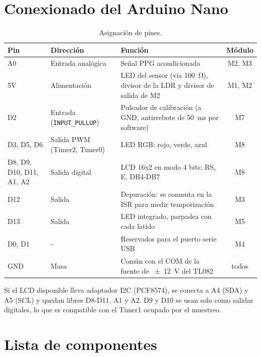 \documentclass[11pt,a4paper]{article}
\begin{document}
\section{Conexionado del Arduino Nano}

\begin{table}[H]
\centering\small
\caption{Asignación de pines.}
\label{tab:pines}
\begin{tabularx}{\textwidth}{llXc}
\toprule
Pin & Dirección & Función & Módulo \\
\midrule
A0      & Entrada analógica & Señal PPG acondicionada & M2, M3 \\
5V      & Alimentación & LED del sensor (vía \qty{100}{\ohm}), divisor de la LDR y divisor de salida de M2 & M1, M2 \\
D2      & Entrada (\texttt{INPUT\_PULLUP}) & Pulsador de calibración (a GND, antirrebote de \qty{50}{ms} por software) & M7 \\
D3, D5, D6 & Salida PWM (Timer2, Timer0) & LED RGB: rojo, verde, azul & M8 \\
D8, D9, D10, D11, A1, A2 & Salida digital & LCD 16x2 en modo 4 bits: RS, E, DB4-DB7 & M8 \\
D12     & Salida & Depuración: se conmuta en la ISR para medir temporización & M3 \\
D13     & Salida & LED integrado, parpadea con cada latido & M5 \\
D0, D1  & - & Reservados para el puerto serie USB & M4 \\
GND     & Masa & Común con el COM de la fuente de \qty{\pm 12}{V} del TL082 & todos \\
\bottomrule
\end{tabularx}
\end{table}

Si el LCD disponible lleva adaptador I2C (PCF8574), se conecta a A4 (SDA) y A5 (SCL) y quedan
libres D8-D11, A1 y A2. D9 y D10 se usan solo como salidas digitales, lo que es compatible con
el Timer1 ocupado por el muestreo.

\section{Lista de componentes}
\end{document}
